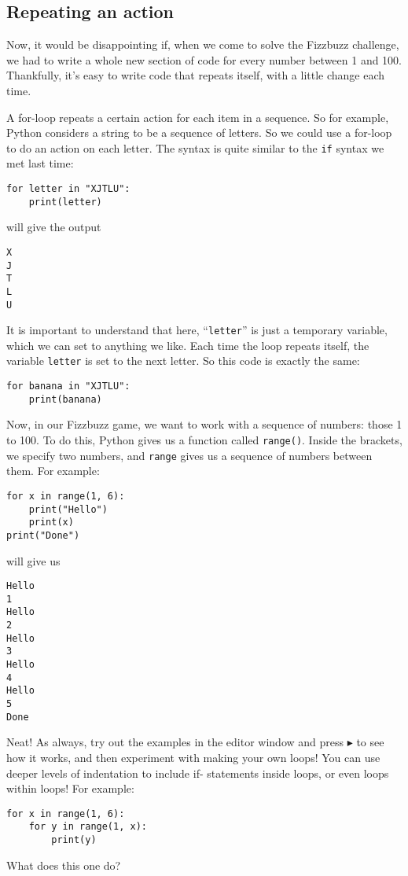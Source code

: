 \documentclass[a4paper]{article}
\begin{document}
\subsection{Repeating an action}

Now, it would be disappointing if, when we come to solve the Fizzbuzz challenge, we had to write a whole new section of code for every number between 1 and 100. Thankfully, it's easy to write code that repeats itself, with a little change each time.

A for-loop repeats a certain action for each item in a sequence. So for example, Python considers a string to be a sequence of letters. So we could use a for-loop to do an action on each letter. The syntax is quite similar to the \verb|if| syntax we met last time:
\begin{lstlisting}
for letter in "XJTLU":
    print(letter)
\end{lstlisting}
\noindent will give the output
\begin{lstlisting}
X
J
T
L
U
\end{lstlisting}
\noindent It is important to understand that here, ``\verb|letter|'' is just a temporary variable, which we can set to anything we like. Each time the loop repeats itself, the variable \verb|letter| is set to the next letter. So this code is exactly the same:
\begin{lstlisting}
for banana in "XJTLU":
    print(banana)
\end{lstlisting}
Now, in our Fizzbuzz game, we want to work with a sequence of numbers: those 1 to 100. To do this, Python gives us a function called \verb|range()|. Inside the brackets, we specify two numbers, and \verb|range| gives us a sequence of numbers between them. For example:
\begin{lstlisting}
for x in range(1, 6):
    print("Hello")
    print(x)
print("Done")
\end{lstlisting}
\noindent will give us
\begin{lstlisting}
Hello
1
Hello
2
Hello
3
Hello
4
Hello
5
Done
\end{lstlisting}
Neat! As always, try out the examples in the editor window and press $\blacktriangleright$ to see how it works, and then experiment with making your own loops! You can use deeper levels of indentation to include if- statements inside loops, or even loops within loops! For example:
\begin{lstlisting}
for x in range(1, 6):
    for y in range(1, x):
        print(y)
\end{lstlisting}
What does this one do?
\end{document}
